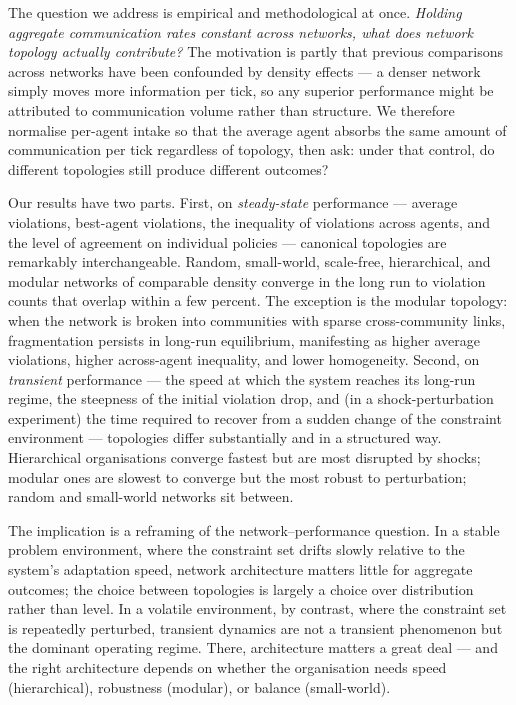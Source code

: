 \documentclass{article}
\begin{document}
The question we address is empirical and methodological at once. \emph{Holding aggregate communication rates constant across networks, what does network topology actually contribute?} The motivation is partly that previous comparisons across networks have been confounded by density effects --- a denser network simply moves more information per tick, so any superior performance might be attributed to communication volume rather than structure. We therefore normalise per-agent intake so that the average agent absorbs the same amount of communication per tick regardless of topology, then ask: under that control, do different topologies still produce different outcomes?

Our results have two parts. First, on \emph{steady-state} performance --- average violations, best-agent violations, the inequality of violations across agents, and the level of agreement on individual policies --- canonical topologies are remarkably interchangeable. Random, small-world, scale-free, hierarchical, and modular networks of comparable density converge in the long run to violation counts that overlap within a few percent. The exception is the modular topology: when the network is broken into communities with sparse cross-community links, fragmentation persists in long-run equilibrium, manifesting as higher average violations, higher across-agent inequality, and lower homogeneity. Second, on \emph{transient} performance --- the speed at which the system reaches its long-run regime, the steepness of the initial violation drop, and (in a shock-perturbation experiment) the time required to recover from a sudden change of the constraint environment --- topologies differ substantially and in a structured way. Hierarchical organisations converge fastest but are most disrupted by shocks; modular ones are slowest to converge but the most robust to perturbation; random and small-world networks sit between.

The implication is a reframing of the network--performance question. In a stable problem environment, where the constraint set drifts slowly relative to the system's adaptation speed, network architecture matters little for aggregate outcomes; the choice between topologies is largely a choice over distribution rather than level. In a volatile environment, by contrast, where the constraint set is repeatedly perturbed, transient dynamics are not a transient phenomenon but the dominant operating regime. There, architecture matters a great deal --- and the right architecture depends on whether the organisation needs speed (hierarchical), robustness (modular), or balance (small-world).
\end{document}
